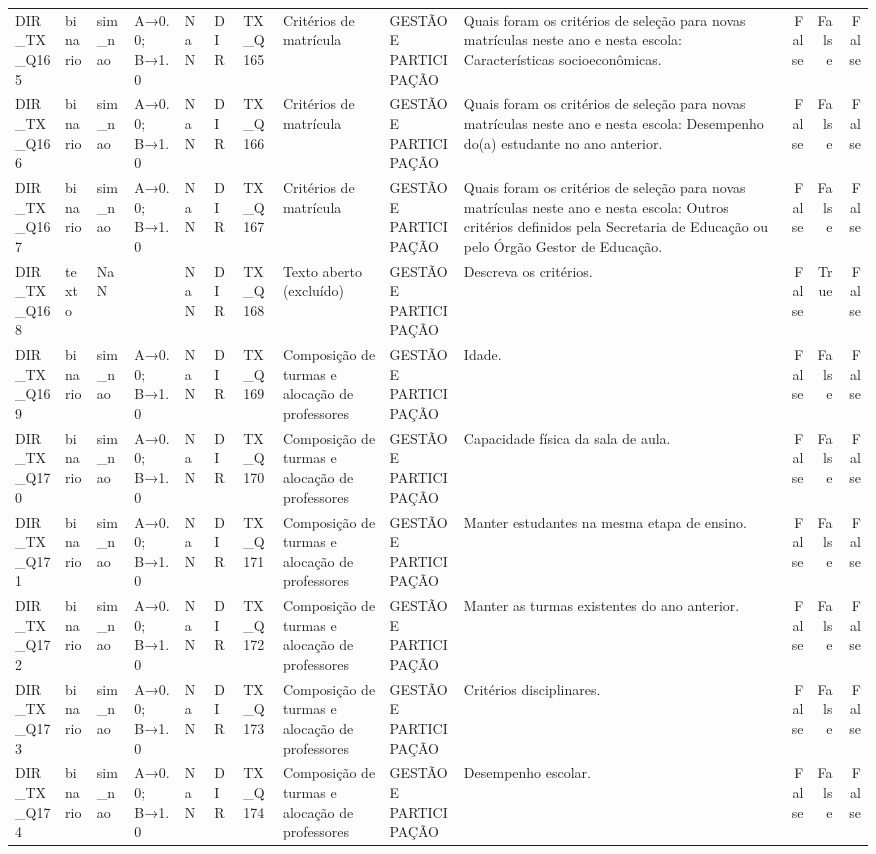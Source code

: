 \begin{tabular}{llllllllllrrr}
DIR\_TX\_Q165 & binario & sim\_nao & A→0.0; B→1.0 & NaN & DIR & TX\_Q165 & Critérios de matrícula & GESTÃO E PARTICIPAÇÃO & Quais foram os critérios de seleção para novas matrículas neste ano e nesta escola: Características socioeconômicas. & False & False & False \\
DIR\_TX\_Q166 & binario & sim\_nao & A→0.0; B→1.0 & NaN & DIR & TX\_Q166 & Critérios de matrícula & GESTÃO E PARTICIPAÇÃO & Quais foram os critérios de seleção para novas matrículas neste ano e nesta escola: Desempenho do(a) estudante no ano anterior. & False & False & False \\
DIR\_TX\_Q167 & binario & sim\_nao & A→0.0; B→1.0 & NaN & DIR & TX\_Q167 & Critérios de matrícula & GESTÃO E PARTICIPAÇÃO & Quais foram os critérios de seleção para novas matrículas neste ano e nesta escola: Outros critérios definidos pela Secretaria de Educação ou pelo Órgão Gestor de Educação. & False & False & False \\
DIR\_TX\_Q168 & texto & NaN &  & NaN & DIR & TX\_Q168 & Texto aberto (excluído) & GESTÃO E PARTICIPAÇÃO & Descreva os critérios. & False & True & False \\
DIR\_TX\_Q169 & binario & sim\_nao & A→0.0; B→1.0 & NaN & DIR & TX\_Q169 & Composição de turmas e alocação de professores & GESTÃO E PARTICIPAÇÃO & Idade. & False & False & False \\
DIR\_TX\_Q170 & binario & sim\_nao & A→0.0; B→1.0 & NaN & DIR & TX\_Q170 & Composição de turmas e alocação de professores & GESTÃO E PARTICIPAÇÃO & Capacidade física da sala de aula. & False & False & False \\
DIR\_TX\_Q171 & binario & sim\_nao & A→0.0; B→1.0 & NaN & DIR & TX\_Q171 & Composição de turmas e alocação de professores & GESTÃO E PARTICIPAÇÃO & Manter estudantes na mesma etapa de ensino. & False & False & False \\
DIR\_TX\_Q172 & binario & sim\_nao & A→0.0; B→1.0 & NaN & DIR & TX\_Q172 & Composição de turmas e alocação de professores & GESTÃO E PARTICIPAÇÃO & Manter as turmas existentes do ano anterior. & False & False & False \\
DIR\_TX\_Q173 & binario & sim\_nao & A→0.0; B→1.0 & NaN & DIR & TX\_Q173 & Composição de turmas e alocação de professores & GESTÃO E PARTICIPAÇÃO & Critérios disciplinares. & False & False & False \\
DIR\_TX\_Q174 & binario & sim\_nao & A→0.0; B→1.0 & NaN & DIR & TX\_Q174 & Composição de turmas e alocação de professores & GESTÃO E PARTICIPAÇÃO & Desempenho escolar. & False & False & False \\

\end{tabular}
